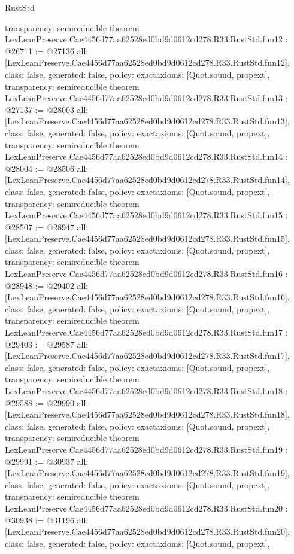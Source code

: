 \begin{lexlean}{RustStd}
\begin{coremodule}
{  transparency: semireducible
}
theorem LexLeanPreserve.Cae4456d77aa62528ed0bd9d0612cd278.R33.RustStd.fun12 : @26711 := @27136 {
  all: [LexLeanPreserve.Cae4456d77aa62528ed0bd9d0612cd278.R33.RustStd.fun12],
  class: false,
  generated: false,
  policy: exact{axioms: [Quot.sound, propext]},
  transparency: semireducible
}
theorem LexLeanPreserve.Cae4456d77aa62528ed0bd9d0612cd278.R33.RustStd.fun13 : @27137 := @28003 {
  all: [LexLeanPreserve.Cae4456d77aa62528ed0bd9d0612cd278.R33.RustStd.fun13],
  class: false,
  generated: false,
  policy: exact{axioms: [Quot.sound, propext]},
  transparency: semireducible
}
theorem LexLeanPreserve.Cae4456d77aa62528ed0bd9d0612cd278.R33.RustStd.fun14 : @28004 := @28506 {
  all: [LexLeanPreserve.Cae4456d77aa62528ed0bd9d0612cd278.R33.RustStd.fun14],
  class: false,
  generated: false,
  policy: exact{axioms: [Quot.sound, propext]},
  transparency: semireducible
}
theorem LexLeanPreserve.Cae4456d77aa62528ed0bd9d0612cd278.R33.RustStd.fun15 : @28507 := @28947 {
  all: [LexLeanPreserve.Cae4456d77aa62528ed0bd9d0612cd278.R33.RustStd.fun15],
  class: false,
  generated: false,
  policy: exact{axioms: [Quot.sound, propext]},
  transparency: semireducible
}
theorem LexLeanPreserve.Cae4456d77aa62528ed0bd9d0612cd278.R33.RustStd.fun16 : @28948 := @29402 {
  all: [LexLeanPreserve.Cae4456d77aa62528ed0bd9d0612cd278.R33.RustStd.fun16],
  class: false,
  generated: false,
  policy: exact{axioms: [Quot.sound, propext]},
  transparency: semireducible
}
theorem LexLeanPreserve.Cae4456d77aa62528ed0bd9d0612cd278.R33.RustStd.fun17 : @29403 := @29587 {
  all: [LexLeanPreserve.Cae4456d77aa62528ed0bd9d0612cd278.R33.RustStd.fun17],
  class: false,
  generated: false,
  policy: exact{axioms: [Quot.sound, propext]},
  transparency: semireducible
}
theorem LexLeanPreserve.Cae4456d77aa62528ed0bd9d0612cd278.R33.RustStd.fun18 : @29588 := @29990 {
  all: [LexLeanPreserve.Cae4456d77aa62528ed0bd9d0612cd278.R33.RustStd.fun18],
  class: false,
  generated: false,
  policy: exact{axioms: [Quot.sound, propext]},
  transparency: semireducible
}
theorem LexLeanPreserve.Cae4456d77aa62528ed0bd9d0612cd278.R33.RustStd.fun19 : @29991 := @30937 {
  all: [LexLeanPreserve.Cae4456d77aa62528ed0bd9d0612cd278.R33.RustStd.fun19],
  class: false,
  generated: false,
  policy: exact{axioms: [Quot.sound, propext]},
  transparency: semireducible
}
theorem LexLeanPreserve.Cae4456d77aa62528ed0bd9d0612cd278.R33.RustStd.fun20 : @30938 := @31196 {
  all: [LexLeanPreserve.Cae4456d77aa62528ed0bd9d0612cd278.R33.RustStd.fun20],
  class: false,
  generated: false,
  policy: exact{axioms: [Quot.sound, propext]},
}
\end{coremodule}
\end{lexlean}
